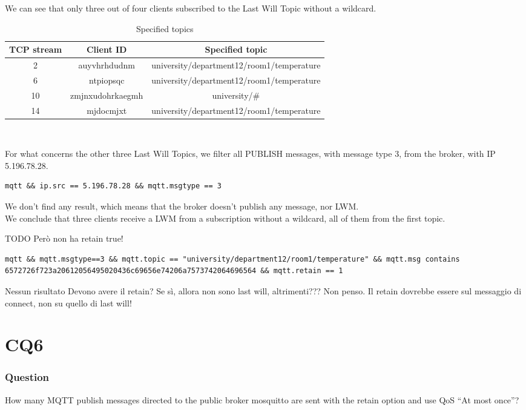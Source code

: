 We can see that only three out of four clients subscribed to the Last Will Topic without a wildcard.

\begin{table}[H]
\centering 
\begin{tabular}{| c | c | c |}
	\hline 
	\rowcolor{bluepoli!40}
	\textbf{TCP stream} & \textbf{Client ID} & \textbf{Specified topic}\T\B \\
	\hline 
	2 & auyvhrhdudnm & university/department12/room1/temperature \T\B\\
	6 & ntpiopsqc & university/department12/room1/temperature \T\B\\
	10 & zmjnxudohrkaegmh & university/\# \T\B\\
	14 & mjdocmjxt & university/department12/room1/temperature \T\B\\
	\hline
\end{tabular}
\\[10pt]
\caption{Specified topics}
\end{table}

For what concerns the other three Last Will Topics, we filter all PUBLISH messages, with message type 3, from the broker, with IP 5.196.78.28.
\begin{verbatim}
mqtt && ip.src == 5.196.78.28 && mqtt.msgtype == 3 
\end{verbatim}
We don't find any result, which means that the broker doesn't publish any message, nor LWM.\\
We conclude that three clients receive a LWM from a subscription without a wildcard, all of them from the first topic.


TODO 
Però non ha retain true!
\begin{verbatim}
mqtt && mqtt.msgtype==3 && mqtt.topic == "university/department12/room1/temperature" && mqtt.msg contains 
6572726f723a20612056495020436c69656e74206a7573742064696564 && mqtt.retain == 1
\end{verbatim}
Nessun risultato
Devono avere il retain? Se sì, allora non sono last will, altrimenti???
Non penso. Il retain dovrebbe essere sul messaggio di connect, non su quello di last will!

\section{CQ6}
\subsubsection{Question}
How many MQTT publish messages directed to the public broker mosquitto are sent with the retain option and use QoS “At most once”?

